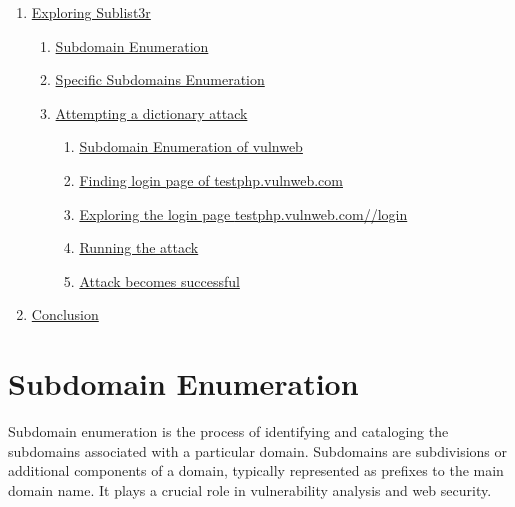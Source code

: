 \documentclass[12pt]{article}
\begin{document}
\begin{enumerate}
\begin{enumerate}
\begin{enumerate}
            \end{enumerate}
        \end{enumerate}
        \item \hyperref[sec:exploring-sublist3r]{Exploring Sublist3r}   
        \begin{enumerate}
            \item \hyperref[subsec:subdomain-enumeration]{Subdomain Enumeration}
            \item \hyperref[subsec:specific-subdomains-enumeration]{Specific Subdomains Enumeration}
            \item \hyperref[subsec:attempting-a-dictionary-attack]{Attempting a dictionary attack}
            \begin{enumerate}
                \item \hyperref[subsubsec:subdomain-enumeration-of-vulnweb]{Subdomain Enumeration of vulnweb}
                \item \hyperref[subsubsec:finding-login-page-of-testphp.vulnweb.com]{Finding login page of \href{http://testphp.vulnweb.com}{testphp.vulnweb.com}}
                \item \hyperref[subsubsec:exploring-the-login-page-testphp.vulnweb.com-login]{Exploring the login page \href{http://testphp.vulnweb.com/login}{testphp.vulnweb.com//login}}
                \item \hyperref[subsubsec:running-the-attack]{Running the attack}
                \item \hyperref[subsubsec:attack-becomes-successful]{Attack becomes successful}
            \end{enumerate}
        \end{enumerate}
        \item \hyperref[sec:conclusion]{Conclusion}
    \end{enumerate}

\section{Subdomain Enumeration}\label{sec:subdomain-enumeration}
Subdomain enumeration is the process of identifying and cataloging the subdomains associated with a particular domain. Subdomains are subdivisions or additional components of a domain, typically represented as prefixes to the main domain name. It plays a crucial role in vulnerability analysis and web security.
\end{document}
